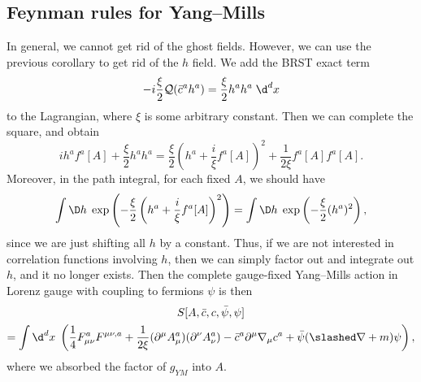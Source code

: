 \documentclass[a4paper]{article}
\begin{document}
\subsection{Feynman rules for Yang--Mills}
In general, we cannot get rid of the ghost fields. However, we can use the previous corollary to get rid of the $h$ field. We add the BRST exact term
\[
  -i\frac{\xi}{2} \mathcal{Q} (\bar{c}^a h^a) = \frac{\xi}{2} h^a h^a \;\d^d x
\]
to the Lagrangian, where $\xi$ is some arbitrary constant. Then we can complete the square, and obtain
\[
  i h^a f^a[A] + \frac{\xi}{2} h^a h^a = \frac{\xi}{2} \left(h^a + \frac{i}{\xi} f^a[A]\right)^2 + \frac{1}{2\xi} f^a[A] f^a[A].
\]
Moreover, in the path integral, for each fixed $A$, we should have
\[
  \int \D h\; \exp \left(-\frac{\xi}{2} \left(h^a + \frac{i}{\xi} f^a[A]\right)^2\right) = \int \D h\; \exp \left(-\frac{\xi}{2} (h^a)^2\right),
\]
since we are just shifting all $h$ by a constant. Thus, if we are not interested in correlation functions involving $h$, then we can simply factor out and integrate out $h$, and it no longer exists.
%
%
Then the complete gauge-fixed Yang--Mills action in Lorenz gauge with coupling to fermions $\psi$ is then
\begin{multline*}
  S[A, \bar{c}, c, \bar\psi, \psi]\\
  = \int\d^d x\; \left(\frac{1}{4} F_{\mu\nu}^a F^{\mu\nu,a} + \frac{1}{2\xi} (\partial^\mu A_\mu^a) (\partial^\nu A_\nu^a) - \bar{c}^a \partial^\mu \nabla_\mu c^a + \bar\psi (\slashed\nabla + m)\psi\right), %
\end{multline*}
where we absorbed the factor of $g_{YM}$ into $A$.
\end{document}
